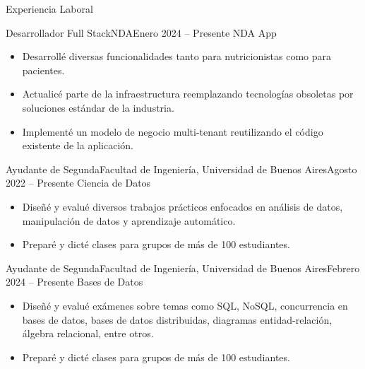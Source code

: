 \documentclass[]{mcdowellcv}
\begin{document}
	\makeheader
	
	\begin{cvsection}{Experiencia Laboral}
		\begin{cvsubsection}{Desarrollador Full Stack}{NDA}{Enero 2024 -- Presente}
			NDA App
			\begin{itemize}
				\item Desarrollé diversas funcionalidades tanto para nutricionistas como para pacientes.
				\item Actualicé parte de la infraestructura reemplazando tecnologías obsoletas por soluciones estándar de la industria.
				\item Implementé un modelo de negocio multi-tenant reutilizando el código existente de la aplicación.
			\end{itemize}
		\end{cvsubsection}
		
		\begin{cvsubsection}{Ayudante de Segunda}{Facultad de Ingeniería, Universidad de Buenos Aires}{Agosto 2022 -- Presente}
			Ciencia de Datos
			\begin{itemize}
				\item Diseñé y evalué diversos trabajos prácticos enfocados en análisis de datos, manipulación de datos y aprendizaje automático.
				\item Preparé y dicté clases para grupos de más de 100 estudiantes.
			\end{itemize}
		\end{cvsubsection}
		
		\begin{cvsubsection}{Ayudante de Segunda}{Facultad de Ingeniería, Universidad de Buenos Aires}{Febrero 2024 -- Presente}
			Bases de Datos
			\begin{itemize}
				\item Diseñé y evalué exámenes sobre temas como SQL, NoSQL, concurrencia en bases de datos, bases de datos distribuidas, diagramas entidad-relación, álgebra relacional, entre otros.
				\item Preparé y dicté clases para grupos de más de 100 estudiantes.
			\end{itemize}
		\end{cvsubsection}
	\end{cvsection}
	
\end{document}

